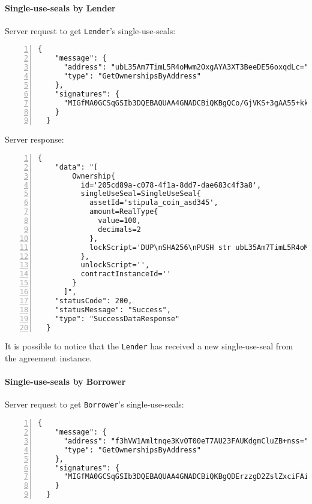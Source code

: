 \paragraph{Single-use-seals by Lender}

Server request to get \verb|Lender|'s single-use-seals:
\begin{Verbatim}[numbers=left,xleftmargin=1cm,firstnumber=1,breaklines=true,breakanywhere=true,tabsize=2]
  {
    "message": {
      "address": "ubL35Am7TimL5R4oMwm2OxgAYA3XT3BeeDE56oxqdLc=",
      "type": "GetOwnershipsByAddress"
    },
    "signatures": {
      "MIGfMA0GCSqGSIb3DQEBAQUAA4GNADCBiQKBgQCo/GjVKS+3gAA55+kko41yINdOcCLQMSBQyuTTkKHE1mhu/TgOpivM0wLPsSga8hQMr3+v3aR0IF/vfCRf6SdiXmWx/jflmEXtnT6fkGcnV6dGNUpHWXSpwUIDt0N88jfnEqekx4S+KDCKg99sGEeHeT65fKS8lB0gjHMt9AOriwIDAQAB": "MomZTc63z7PfH35c1dL4tjXebcsW+0Zxl0nP1NQdcUFws98DX+bMWI7L0C6IO5lxvkYve4zdio1Crn97FXvngK4aVfiEZEnHOJ0tstq7uQYGErM3DDAABqPq8HH5yoKnLST2LWpO0oD8G/VXvIE6qMT5D34W1Ci0q4uh+7y3EcY="
    }
  }
\end{Verbatim}

Server response:
\begin{Verbatim}[numbers=left,xleftmargin=1cm,firstnumber=1,breaklines=true,breakanywhere=true,tabsize=2]
  {
    "data": "[
        Ownership{
          id='205cd89a-c078-4f1a-8dd7-dae683c4f3a8', 
          singleUseSeal=SingleUseSeal{
            assetId='stipula_coin_asd345', 
            amount=RealType{
              value=100, 
              decimals=2
            }, 
            lockScript='DUP\nSHA256\nPUSH str ubL35Am7TimL5R4oMwm2OxgAYA3XT3BeeDE56oxqdLc=\nEQUAL\nCHECKSIG\nHALT\n'
          }, 
          unlockScript='', 
          contractInstanceId=''
        }
      ]",
    "statusCode": 200,
    "statusMessage": "Success",
    "type": "SuccessDataResponse"
  }
\end{Verbatim}

It is possible to notice that the \verb|Lender| has received a new single-use-seal from the agreement 
instance.

\paragraph{Single-use-seals by Borrower}

Server request to get \verb|Borrower|'s single-use-seals:
\begin{Verbatim}[numbers=left,xleftmargin=1cm,firstnumber=1,breaklines=true,breakanywhere=true,tabsize=2]
  {
    "message": {
      "address": "f3hVW1Amltnqe3KvOT00eT7AU23FAUKdgmCluZB+nss=",
      "type": "GetOwnershipsByAddress"
    },
    "signatures": {
      "MIGfMA0GCSqGSIb3DQEBAQUAA4GNADCBiQKBgQDErzzgD2ZslZxciFAiX3/ot7lrkZDw4148jFZrsDZPE6CVs9xXFSHGgy/mFvIFLXhnChO6Nyd2be3lbgeavLMCMVUiTStXr117Km17keWpb3sItkKKsLFBOcIIU8XXowI/OhzQN2XPZYESHgjdQ5vwEj2YyueiS7WKP94YWz/pswIDAQAB": "hSNodnUyusffNlv+KNq4605pFvqh91pVspFhTgbmWccE/LKM6h4bedpvTgMHoVDezvA7v2XTzmLG5eL3lOeA6I2xJMH32DcV60IPSoh61oVHnwPQcQHY039D4y5VSJ0GMQJKIcTEq3fqIdabg7261xUaegHUnXrcyynh9GpMJxk="
    }
  }
\end{Verbatim}

